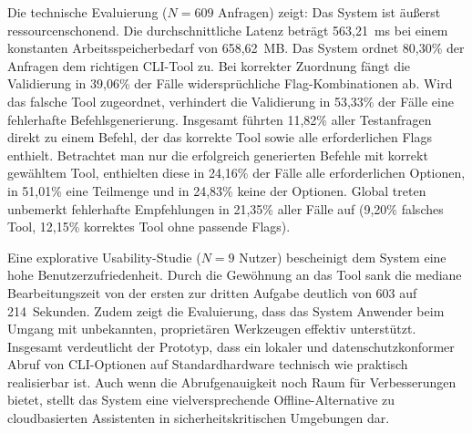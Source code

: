 Die technische Evaluierung ($N = 609$ Anfragen) zeigt: Das System ist äußerst ressourcenschonend. Die durchschnittliche Latenz beträgt 563,21~ms bei einem konstanten Arbeitsspeicherbedarf von 658,62~MB. Das System ordnet 80,30\% der Anfragen dem richtigen CLI-Tool zu. Bei korrekter Zuordnung fängt die Validierung in 39,06\% der Fälle widersprüchliche Flag-Kombinationen ab. Wird das falsche Tool zugeordnet, verhindert die Validierung in 53,33\% der Fälle eine fehlerhafte Befehlsgenerierung. Insgesamt führten 11,82\% aller Testanfragen direkt zu einem Befehl, der das korrekte Tool sowie alle erforderlichen Flags enthielt. Betrachtet man nur die erfolgreich generierten Befehle mit korrekt gewähltem Tool, enthielten diese in 24,16\% der Fälle alle erforderlichen Optionen, in 51,01\% eine Teilmenge und in 24,83\% keine der Optionen. Global treten unbemerkt fehlerhafte Empfehlungen in 21,35\% aller Fälle auf (9,20\% falsches Tool, 12,15\% korrektes Tool ohne passende Flags).

Eine explorative Usability-Studie ($N=9$ Nutzer) bescheinigt dem System eine hohe Benutzerzufriedenheit. Durch die Gewöhnung an das Tool sank die mediane Bearbeitungszeit von der ersten zur dritten Aufgabe deutlich von 603 auf 214~Sekunden. Zudem zeigt die Evaluierung, dass das System Anwender beim Umgang mit unbekannten, proprietären Werkzeugen effektiv unterstützt. Insgesamt verdeutlicht der Prototyp, dass ein lokaler und datenschutzkonformer Abruf von CLI-Optionen auf Standardhardware technisch wie praktisch realisierbar ist. Auch wenn die Abrufgenauigkeit noch Raum für Verbesserungen bietet, stellt das System eine vielversprechende Offline-Alternative zu cloudbasierten Assistenten in sicherheitskritischen Umgebungen dar.